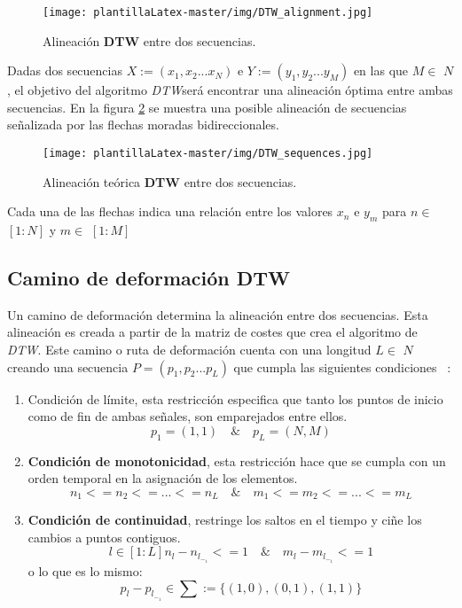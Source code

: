 \begin{figure}[H]
    \centering
    \texttt{[image: plantillaLatex-master/img/DTW\_alignment.jpg]}
    \caption{Alineación \textbf{DTW} entre dos secuencias.}
    \label{fig:dtw1}
\end{figure}

Dadas dos secuencias $X:=(x_1, x_2 ... x_N)$ e $Y:=(y_1, y_2 ... y_M)$ en las que $M \in$ $N$, el objetivo del algoritmo \emph{DTW}será encontrar una alineación óptima entre ambas secuencias. En la figura \ref{fig:dtw2} se muestra una posible alineación de secuencias señalizada por las flechas moradas bidireccionales.


\begin{figure}[H]
    \centering
    \texttt{[image: plantillaLatex-master/img/DTW\_sequences.jpg]}
    \caption{Alineación teórica \textbf{DTW} entre dos secuencias.}
    \label{fig:dtw2}
\end{figure}

Cada una de las flechas indica una relación entre los valores $x_n$ e $y_m$ para $n \in $  $[1:N]$ y $m \in$ $[1:M]$ 


\subsection{Camino de deformación DTW}
Un camino de deformación determina la alineación entre dos secuencias. Esta alineación es creada a partir de la matriz de costes que crea el algoritmo de \emph{DTW}. Este camino o ruta de deformación cuenta con una longitud $L \in$ $N$ creando una secuencia $P = (p_1, p_2 ... p_L) $ que cumpla las siguientes condiciones ~\cite{bishop2006pattern}: 
\begin{enumerate}
    \item \textbf{}{Condición de límite}, esta restricción especifica que tanto los puntos de inicio como de fin de ambas señales, son emparejados entre ellos.
    \begin{equation}
        p_1 = (1,1) \quad \& \quad p_L = (N,M)
    \end{equation}
    \item \textbf{Condición de monotonicidad}, esta restricción hace que se cumpla con un orden temporal en la asignación de los elementos.
    \begin{equation}
        n_1 <= n_2 <= ... <= n_L \quad \& \quad m_1 <= m_2 <= ... <= m_L
    \end{equation}
    \item \textbf{Condición de continuidad}, restringe los saltos en el tiempo y ciñe los cambios a puntos contiguos.
    \begin{equation}
        l \in [1:L]  n_l - n_l_-_1 <= 1 \quad \& \quad m_l - m_l_-_1 <= 1
    \end{equation}
    o lo que es lo mismo:
    \begin{equation}
        p_l - p_l_-_1  \in \sum := \{(1,0),(0,1),(1,1)\}
    \end{equation}
\end{enumerate}

